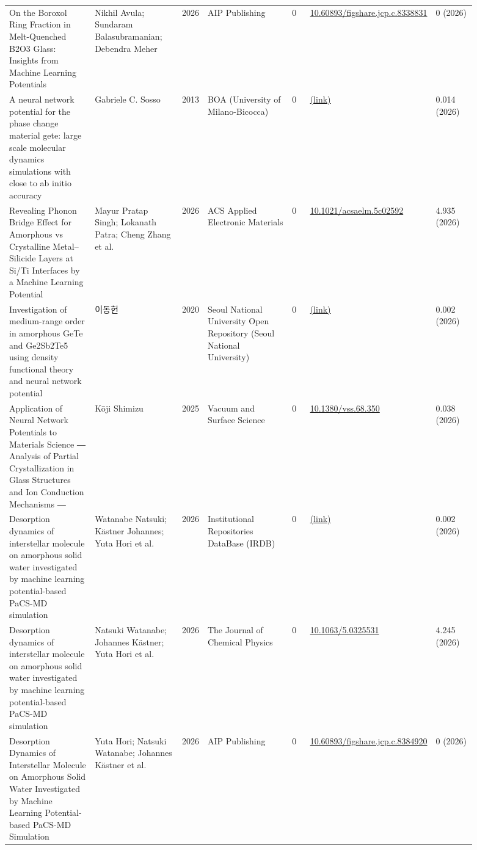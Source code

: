 \documentclass[10pt,a4paper]{article}
\begin{document}
{\begin{longtable}{p{0.192\linewidth}p{0.192\linewidth}p{0.043\linewidth}p{0.192\linewidth}p{0.043\linewidth}p{0.132\linewidth}p{0.096\linewidth}}
On the Boroxol Ring Fraction in Melt-Quenched B2O3 Glass: Insights from Machine Learning Potentials & Nikhil Avula; Sundaram Balasubramanian; Debendra Meher & 2026 & AIP Publishing & 0 & \href{https://doi.org/10.60893/figshare.jcp.c.8338831}{10.60893/figshare.jcp.c.8338831} & 0 (2026) \\
A neural network potential for the phase change material gete: large scale molecular dynamics simulations with close to ab initio accuracy & Gabriele C. Sosso & 2013 & BOA (University of Milano-Bicocca) & 0 & \href{https://openalex.org/W2341698921}{(link)} & 0.014 (2026) \\
Revealing Phonon Bridge Effect for Amorphous vs Crystalline Metal–Silicide Layers at Si/Ti Interfaces by a Machine Learning Potential & Mayur Pratap Singh; Lokanath Patra; Cheng Zhang et al. & 2026 & ACS Applied Electronic Materials & 0 & \href{https://doi.org/10.1021/acsaelm.5c02592}{10.1021/acsaelm.5c02592} & 4.935 (2026) \\
Investigation of medium-range order in amorphous GeTe and Ge2Sb2Te5 using density functional theory and neural network potential & 이동헌 & 2020 & Seoul National University Open Repository (Seoul National University) & 0 & \href{https://openalex.org/W3138260678}{(link)} & 0.002 (2026) \\
Application of Neural Network Potentials to Materials Science ― Analysis of Partial Crystallization in Glass Structures and Ion Conduction Mechanisms ― & Kōji Shimizu & 2025 & Vacuum and Surface Science & 0 & \href{https://doi.org/10.1380/vss.68.350}{10.1380/vss.68.350} & 0.038 (2026) \\
Desorption dynamics of interstellar molecule on amorphous solid water investigated by machine learning potential-based PaCS-MD simulation & Watanabe Natsuki; Kästner Johannes; Yuta Hori et al. & 2026 & Institutional Repositories DataBase (IRDB) & 0 & \href{https://openalex.org/W7169694995}{(link)} & 0.002 (2026) \\
Desorption dynamics of interstellar molecule on amorphous solid water investigated by machine learning potential-based PaCS-MD simulation & Natsuki Watanabe; Johannes Kästner; Yuta Hori et al. & 2026 & The Journal of Chemical Physics & 0 & \href{https://doi.org/10.1063/5.0325531}{10.1063/5.0325531} & 4.245 (2026) \\
Desorption Dynamics of Interstellar Molecule on Amorphous Solid Water Investigated by Machine Learning Potential-based PaCS-MD Simulation & Yuta Hori; Natsuki Watanabe; Johannes Kästner et al. & 2026 & AIP Publishing & 0 & \href{https://doi.org/10.60893/figshare.jcp.c.8384920}{10.60893/figshare.jcp.c.8384920} & 0 (2026) \\

\end{longtable}}
\end{document}
